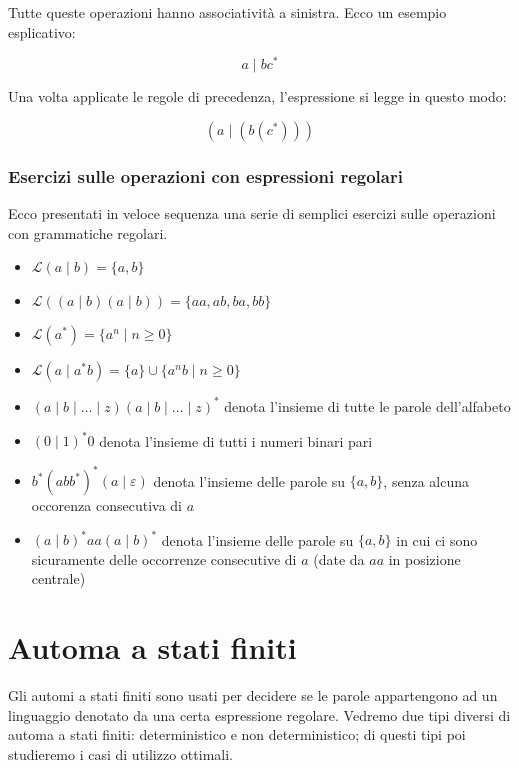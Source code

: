 \documentclass[class=book, crop=false, oneside, 12pt]{standalone}
\begin{document}
\noindent Tutte queste operazioni hanno associatività a sinistra.
Ecco un esempio esplicativo:

\begin{equation*}
    a \mid b c^\ast
\end{equation*}

\noindent Una volta applicate le regole di precedenza, l'espressione si legge in questo modo:

\begin{equation*}
    (a \mid ( b  ( c^\ast ) ) )
\end{equation*}    

\subsubsection{Esercizi sulle operazioni con espressioni regolari}
Ecco presentati in veloce sequenza una serie di semplici esercizi sulle operazioni con grammatiche regolari. 

\begin{itemize}
    \item \(\mathcal{L}(a \mid b) = \{a, b\}\)
    \item \(\mathcal{L}((a \mid b) (a \mid b)) = \{aa, ab, ba, bb\}\)
    \item \(\mathcal{L}(a^*) = \{a^n \mid n \ge 0\}\)
    \item \(\mathcal{L}(a \mid a^\ast b) = \{a\} \cup \{a^n b \mid n \ge 0\}\)
    \item \( (a \mid b \mid \ldots \mid z)(a \mid b \mid \ldots \mid z)^\ast \) denota l’insieme di tutte le parole dell’alfabeto
    \item \( (0 \mid 1)^\ast 0\) denota l’insieme di tutti i numeri binari pari
    \item \( b^\ast (abb^\ast )^\ast ( a \mid \varepsilon ) \) denota l’insieme delle parole su \(\{a,b\} \), senza alcuna occorenza consecutiva di \(a\)
    \item \( (a \mid b)^\ast aa(a \mid b)^\ast \) denota l’insieme delle parole su \( \{a,b\} \) in cui ci sono sicuramente delle occorrenze consecutive di \(a\) (date da \(aa\) in posizione centrale)
\end{itemize}

\section{Automa a stati finiti}
Gli automi a stati finiti sono usati per decidere se le parole appartengono ad un linguaggio denotato da una certa espressione regolare.
Vedremo due tipi diversi di automa a stati finiti: deterministico e non deterministico; di questi tipi poi studieremo i casi di utilizzo ottimali.
\end{document}
